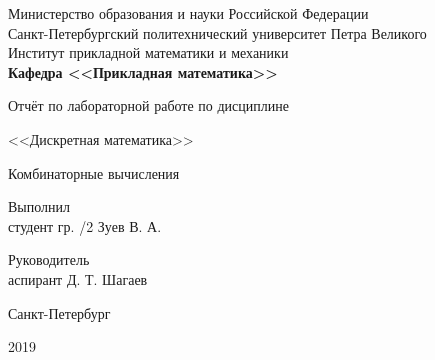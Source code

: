 \documentclass[zuev-report.tex]{subfiles}
\begin{document}
\begin{titlepage}
\begin{centering}

Министерство образования и науки Российской Федерации\\
Санкт-Петербургский политехнический университет Петра Великого\\
Институт прикладной математики и механики\\

\textbf{Кафедра <<Прикладная математика>>}
\par
\vfill

\large
Отчёт по лабораторной работе по дисциплине\\
\par
<<Дискретная математика>>
\par
\Large{Комбинаторные вычисления}
\vfill

\begin{flushleft}
Выполнил\\
студент гр. /2 \hrulefill Зуев В. А.\\
\end{flushleft}
\begin{flushleft}
Руководитель\\
аспирант \hrulefill Д. Т. Шагаев\\
\end{flushleft}
\vfill
\normalsize

Санкт-Петербург
\par
2019

\end{centering}
\end{titlepage}
\end{document}
